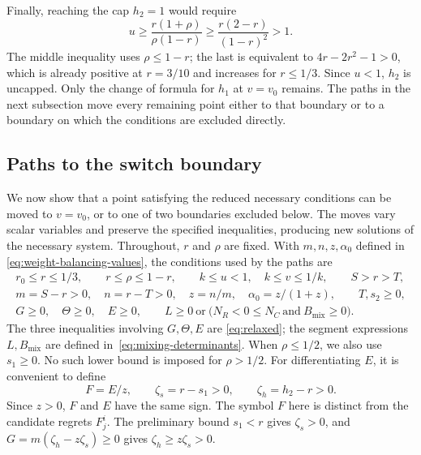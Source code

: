 \documentclass[11pt]{article}
\theoremstyle{remark}
\theoremstyle{plain}
\begin{document}
Finally, reaching the cap $h_2=1$ would require
\begin{equation}
 u\ge\frac{r(1+\rho)}{\rho(1-r)}
       \ge\frac{r(2-r)}{(1-r)^2}>1.
 \label{eq:weight-h2-cap-inactive}
\end{equation}
The middle inequality uses $\rho\le1-r$; the last is equivalent
to $4r-2r^2-1>0$, which is already positive at $r=3/10$ and
increases for $r\le1/3$. Since $u<1$, $h_2$ is uncapped.
Only the change of formula for $h_1$ at $v=v_0$ remains.
The paths in the next subsection move every remaining point either
to that boundary or to a boundary on which the conditions are
excluded directly.

\subsection{Paths to the switch boundary}
\label{app:paths}

We now show that a point satisfying the reduced necessary conditions
can be moved to $v=v_0$, or to one of two boundaries excluded below.
The moves vary scalar variables and preserve the specified
inequalities, producing new solutions of the necessary system.
Throughout, $r$ and $\rho$ are fixed. With $m,n,z,\alpha_0$ defined in
\eqref{eq:weight-balancing-values}, the conditions used by the paths are
\begin{equation}
 \begin{gathered}
 r_0\le r\le1/3,\qquad r\le\rho\le1-r,\qquad
 k\le u<1,\quad k\le v\le1/k,\qquad S>r>T,\\
 m=S-r>0,\quad n=r-T>0,\quad z=n/m,\quad
 \alpha_0=z/(1+z),\qquad T,s_2\ge0,\\
 G\ge0,\quad \Theta\ge0,\quad E\ge0,\qquad
 L\ge0\ \text{or}\
 \bigl(N_R<0\le N_C\ \text{and}\ B_{\mathrm{mix}}\ge0\bigr).
 \end{gathered}
 \label{eq:path-conditions}
\end{equation}
The three inequalities involving $G,\Theta,E$ are
\eqref{eq:relaxed}; the segment expressions $L,B_{\mathrm{mix}}$
are defined in~\eqref{eq:mixing-determinants}. When $\rho\le1/2$, we also use
$s_1\ge0$. No such lower bound is imposed for $\rho>1/2$.
For differentiating $E$, it is convenient to define
\begin{equation}
 F=E/z,\qquad \zeta_s=r-s_1>0,\qquad \zeta_h=h_2-r>0.
 \label{eq:path-derivative-quantities}
\end{equation}
Since $z>0$, $F$ and $E$ have the same sign. The symbol $F$ here
is distinct from the candidate regrets $F_j^i$.
The preliminary bound $s_1<r$ gives $\zeta_s>0$, and
$G=m(\zeta_h-z\zeta_s)\ge0$ gives $\zeta_h\ge z\zeta_s>0$.
\end{document}
